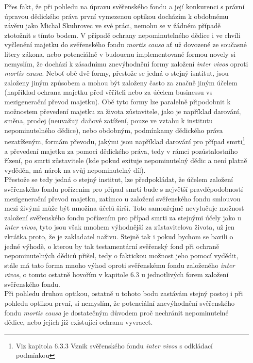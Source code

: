 \documentclass{article}
\begin{document}
 Přes fakt, že při pohledu na úpravu svěřenského fondu a její konkurenci s právní úpravou dědického práva první vymezenou optikou docházím k obdobnému závěru jako Michal Skuhrovec ve své práci, nemohu se v žádném případě ztotožnit s tímto bodem. V případě ochrany nepominutelného dědice i ve chvíli vyčlenění majetku do svěřenského fondu \textit{mortis causa} ať už dovozené ze současné litery zákona, nebo potenciálně v budoucnu implementované formou novely si nemyslím, že dochází k zásadnímu znevýhodnění formy založení \textit{inter vivos} oproti \textit{mortis causa}. Neboť obě dvě formy, přestože se jedná o stejný isntitut, jsou založeny jiným způsobem a mohou být založeny často za značně jiným účelem (například ochrana majetku před věřiteli nebo za účelem businessu vs mezigenerační převod majetku). Obě tyto formy lze paralelně připodobnit k možnostem převedení majetku za života zůstavitele, jako je například darování, směna, prodej (neuvažuji daňové zatížení, pouze ve vztahu k institutu nepominutelného dědice), nebo obdobným, podmínkamy dědického práva nezatíženým, formám převodu, jakými jsou například darování pro případ smrti\footnote{Viz kapitola 6.3.3 Vznik svěřenského fondu \textit{inter vivos} s odkládací podmínkou} a převedení majetku za pomoci dědického práva, tedy v rámci pozůstalostního řízení, po smrti zůstavitele (kde pokud exituje nepominutelný dědic a není platně vyděděn, má nárok na svůj nepominutelný díl).\\
 
 Přestože se tedy jedná o stejný institut, lze předpokládat, že účelem založení svěřenského fondu pořízením pro případ smrti bude s největší pravděpodobností mezigenerační převod majetku, zatímco u založení svěřenského fondu smlouvou mezi živými může být množina účelů širší. Toto samozřejmě nevylučuje možnost založení svěřenského fondu pořízením pro případ smrti za stejnými účely jako u \textit{inter vivos}, tyto jsou však mnohem výhodnější za zůstavitelova života, už jen zkrátka proto, že je zakladatel naživu. Stejně tak i pokud bychom se bavili o jedné výhodě, o kterou by tak testamentární svěřenský fond při ochraně nepominutelných dědiců přišel, tedy o faktickou možnost jeho pomocí vydědit, stále má tato forma mnoho výhod oproti svěřenskému fondu založeného \textit{inter vivos}, o tomto ostatně hovořím v kapitole 6.3 u jednotlivých forem založení svěřenského fondu.\\
 
 Při pohledu druhou optikou, ostatně u tohoto bodu zastávám stejný postoj i při pohledu optikou první, si nemyslím, že potenciální znevýhodnění svěřenského fondu \textit{mortis causa} je dostatečným důvodem proč nechránit nepominutelné dědice, nebo jejich již existující ochranu vyvracet.\\
 
\end{document}
